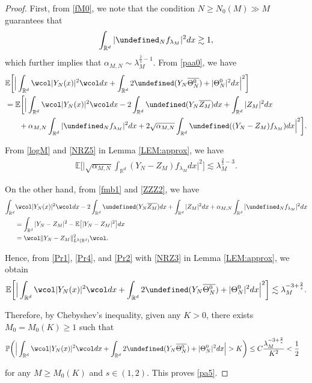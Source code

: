 \documentclass[%
11pt,  reqno]{amsart}
\theoremstyle{remarkstyle}
\newcommand{\1}{\hspace{0.2mm}\text{I}\hspace{0.2mm}}
\newcommand{\noi}{\noindent}
\newcommand{\R}{\mathbb{R}}
\let\Re=\undefined\DeclareMathOperator*{\Re}{Re}
\let\P= \undefined
\newcommand{\P}{\mathbf{P}}
\newcommand{\E}{\mathbb{E}}
\newcommand{\al}{\alpha}
\newcommand{\ld}{\lambda}
\newcommand{\cj}{\overline}
\newcommand{\wick}[1]{\wcol#1\wcol}
\newcommand{\les}{\lesssim}
\newcommand{\ges}{\gtrsim}
\newcommand{\PP}{\mathbb{P}}
\numberwithin{equation}{section}
\numberwithin{theorem}{section}
\newcommand{\Dr}{\Theta}
\begin{document}
	\begin{proof} 
		First, from \eqref{fM0}, we note that the condition $N\ge N_0(M) \gg M$ guarantees that 
		\begin{align} 
			\label{N_0(M)} 
			\int_{{\R^d}} |\P_{N}f_{\ld_M}|^2 dx \ges 1,
		\end{align}
		which further implies that $\al_{M,N} \sim \ld_M^{\frac2s-1}$.
		From \eqref{paa0}, we have 
		\begin{align}
			\begin{split}
				&\E \bigg[ \Big| \int_{\R^d} \wick{|Y_N (x)|^2} dx  + \int_{\R^d} 2 \Re(Y_N \cj{\Dr^0_N}) + |\Dr^0_N|^2  dx \Big|^2 \bigg]\\
				&= \E \bigg[ \Big|\int_{\R^d} \wick{|Y_N (x)|^2} dx  - 2 \int_{{\R^d}} \Re(Y_N \cj{Z_M}) dx+\int_{{\R^d}} |Z_M|^2 dx\\
				&\hphantom{XX}
				+ \al_{M, N} \int_{{\R^d}} |\P_{N}f_{\ld_M}|^2 dx  + 2 \sqrt{ \al_{M, N}}  \int_{{\R^d}} \Re( (Y_N-Z_M)f_{\ld_M}) dx \Big|^2 \bigg].
			\end{split}
			\label{Pr1}
		\end{align}
		
		\noi
		From \eqref{logM} and \eqref{NRZ5} in Lemma \ref{LEM:approx}, we have
		\begin{align}
			\E \bigg[ \Big| \sqrt{ \al_{M, N}}  \int_{{\R^d}} (Y_N-Z_M)f_{\ld_M} dx   \Big|^2   \bigg] \les   \ld_M^{\frac{2}s-3}.
			\label{Pr4}
		\end{align}	
		
		\noi
		On the other hand, 
		from \eqref{fmb1} and \eqref{ZZZ2}, we have	
		\begin{align}
			\begin{split}
				\int_{\R^d} & \wick{|Y_N (x)|^2} dx - 2  \int_{{\R^d}} \Re(Y_N \cj{Z_M}) dx+\int_{{\R^d}} |Z_M|^2 dx+ \al_{M, N} \int_{{\R^d}} |\P_{N}f_{\ld_M}|^2 dx \\
				& =\int_{{\R^d}} |Y_N-Z_M|^2 -\E \big[|Y_N-Z_M |^2 \big] dx \\
				& =\wick{\| Y_N-Z_M\|_{L^2({\R^d})}^2  }.
			\end{split}
			\label{Pr2} 
		\end{align}	
		
		\noi
		Hence, from \eqref{Pr1}, \eqref{Pr4}, and \eqref{Pr2} with \eqref{NRZ3}
		in Lemma \ref{LEM:approx}, we obtain
		\begin{align*}
			\E \bigg[ \Big|   \int_{\R^d} \wick{|Y_N (x)|^2} dx + \int_{\R^d} 2 \Re(Y_N \cj{\Dr^0_N}) + |\Dr^0_N|^2  dx \Big|^2 \bigg]\les \ld_M^{-  3 +\frac2s}.
		\end{align*}
		
		\noi
		Therefore, by Chebyshev's inequality, 
		given any $K > 0$, there exists $M_0 = M_0(K) \geq 1$ such that 
		\begin{align}
			\PP\bigg( \Big|  \int_{\R^d} \wick{|Y_N (x)|^2} dx + \int_{\R^d} 2 \Re(Y_N \cj{\Dr^0_N}) + |\Dr^0_N|^2  dx \Big| > K \bigg)
			&\le C\frac{\ld_M^{-3+\frac2s}}{K^2}
			< \frac 12
			\label{M_0(K)}
		\end{align}
		
		
		\noi
		for any $M \ge M_0 (K)$ and $s\in (1,2)$.
		This proves  \eqref{pa5}.
	\end{proof}
	
\end{document}
